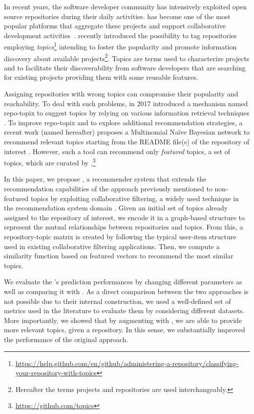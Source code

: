 In recent years, the software developer community has intensively exploited open source 
repositories during their daily activities. \GH has become one of the most
popular platforms that aggregate these projects and support collaborative 
development activities~\cite{7832894}. \GH recently introduced the possibility 
to tag repositories employing 
\emph{topics}\footnote{\url{https://help.github.com/en/github/administering-a-repository/classifying-your-repository-with-topics}}
 intending to foster the popularity and promote information discovery about 
available projects\footnote{Hereafter the terms \GH projects and repositories 
are used 
interchangeably.}. Topics are terms used to characterize projects and to 
facilitate their discoverability from software developers that are searching 
for existing projects providing them with some reusable features. 

Assigning repositories with wrong topics can compromise their popularity and 
reachability. To deal with such problems, in 2017 \GH introduced a 
mechanism named repo-topix to suggest topics by relying on various information 
retrieval techniques \cite{repo-topix}. To improve repo-topix 
and to explore additional recommendation strategies, a recent work (named \MNB 
hereafter) proposes a Multinomial Na\"ive Bayesian network to 
recommend relevant topics starting from the README file(s) of the repository of 
interest \cite{10.1145/3383219.3383227}. However, such a tool can recommend 
only \emph{featured} topics, \ie a set of topics, which are curated by 
\GH.\footnote{\url{https://github.com/topics}}


In this paper, we propose \TF, a recommender system that extends the 
recommendation capabilities of the \MNB approach previously mentioned to 
non-featured topics by exploiting collaborative filtering, a widely used 
technique in the recommendation system domain 
\cite{Schafer:2007:CFR:1768197.1768208}. Given an initial set of topics already 
assigned to the \GH repository of interest, we encode it in a graph-based 
structure to represent the mutual relationships between repositories and 
topics. From this, a repository-topic matrix is created by following the 
typical user-item structure used in existing collaborative filtering 
applications. Then, we compute a similarity function based on featured vectors 
to recommend the most similar topics.

We evaluate the \TF's prediction performances by changing different parameters 
as well as comparing it with \MNB. As a direct comparison between the two approaches %
is not
possible due to their internal construction, 
we used a well-defined set of metrics used in the literature to evaluate them by 
considering different datasets. More importantly, we showed that by augmenting \MNB with \TF, we are able to provide more relevant topics, given a repository. In this sense, we substantially improved the performance of the original \MNB approach.

